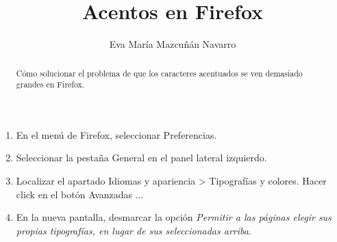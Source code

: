 \documentclass{ximera}
\author{Eva María Mazcuñán Navarro}
\title{Acentos en Firefox}
\begin{document}
\begin{abstract}
  Cómo solucionar el problema de que los caracteres acentuados se ven demasiado grandes en Firefox.
\end{abstract}

\maketitle

\begin{enumerate}
	\item En el menú de Firefox, seleccionar {\ttfamily Preferencias}.
	
	\item Seleccionar la pestaña {\ttfamily General} en el panel lateral izquierdo.
	
	\item Localizar el apartado {\ttfamily Idiomas y apariencia > Tipografías y colores}. Hacer click en el botón {Avanzadas ...}
	
	\item En la nueva pantalla, desmarcar la opción {\itshape Permitir a las páginas elegir sus propias tipografías, en lugar de sus seleccionadas arriba}.
\end{enumerate}
\end{document}
